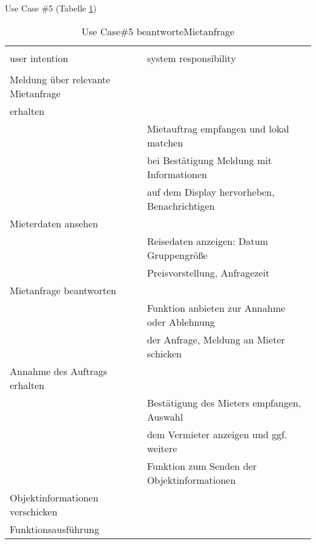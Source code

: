 \newpage
Use Case \#5 (Tabelle \ref{tab:mietanfrageUC})
\begin{table}[H]
\caption{Use Case\#5 beantworteMietanfrage }
\centering
\begin{tabular}{l l}
\\ [-0.5ex]

\hline\hline
\\ [-0.5ex]
user intention & system responsibility
\\ [1.5ex]
\hline
\\ [-0.5ex]
Meldung über relevante Mietanfrage  &                                   \\[1ex]
erhalten                      &                                   \\[1ex]
                           & Mietauftrag empfangen und lokal matchen    \\[1ex]
                           & bei Bestätigung Meldung mit Informationen     \\[1ex]
                           & auf dem Display hervorheben, Benachrichtigen  \\[1ex]
Mieterdaten ansehen              &                                   \\[1ex]
                           & Reisedaten anzeigen: Datum Gruppengröße    \\[1ex]
                           & Preisvorstellung, Anfragezeit              \\[1ex]
Mietanfrage beantworten          &                                   \\[1ex] 
                           & Funktion anbieten zur Annahme oder Ablehnung  \\[1ex]
                           & der Anfrage, Meldung an Mieter schicken       \\[1ex]
Annahme des Auftrags erhalten    &                                   \\[1ex]
                           & Bestätigung des Mieters empfangen, Auswahl \\[1ex]
                           & dem Vermieter anzeigen und ggf. weitere       \\[1ex]
                           & Funktion zum Senden der Objektinformationen   \\[1ex]
Objektinformationen verschicken     &                                   \\[1ex]
Funktionsausführung              &                                   \\[1ex]



\hline
\end{tabular}
\label{tab:mietanfrageUC}
\end{table}


